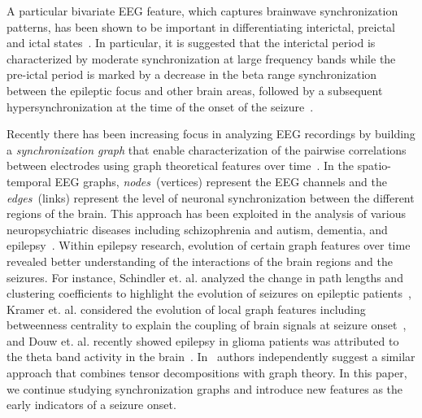 \documentclass{article} %
\theoremstyle{definition}
\theoremstyle{remark}
\begin{document}
A particular bivariate EEG feature, which captures  brainwave synchronization patterns, has been shown to be important in differentiating interictal, preictal and ictal states~\cite{vanquyen_ictogenesis,levan_preictal}.  In particular, it is  suggested that the interictal period is characterized by moderate synchronization at large frequency bands while the pre-ictal period is marked by a decrease in the beta range synchronization between the epileptic focus and other brain areas, followed by a subsequent hypersynchronization at the time of the onset of the seizure~\cite{mirowski_seizure_prediction_classification}.

Recently there has been increasing focus in analyzing EEG recordings by building a {\em synchronization graph} that enable characterization of the pairwise correlations between electrodes using graph theoretical features over time~\cite{bullmore2009complex,stam2012organization}.  In the spatio-temporal EEG  graphs, {\em nodes}~(vertices) represent the EEG channels and the {\em edges}~(links) represent the level of  neuronal synchronization between the different regions of the brain.  This approach has been exploited in the analysis of various neuropsychiatric diseases including schizophrenia and autism, dementia, and epilepsy~\cite{stam2012organization}.  Within epilepsy research,  evolution  of certain  graph  features over time revealed better understanding of the interactions  of the brain regions and the seizures.  For instance, Schindler et. al. analyzed the change in path lengths and clustering coefficients to highlight the evolution of seizures on epileptic patients~\cite{schindler2008evolving}, Kramer et. al.  considered  the  evolution  of  local graph features including betweenness centrality to explain the coupling of brain signals at seizure onset~\cite{kramer2008emergent}, and Douw et. al. recently showed epilepsy in glioma patients was attributed to the theta band activity in the brain~\cite{douw2010epilepsy}.  In~\cite{mahyari_tensor_brain} authors independently suggest a similar approach that combines tensor decompositions with graph theory.  In  this paper, we continue studying synchronization graphs  and introduce new features as the early indicators of a seizure onset.
\end{document}
